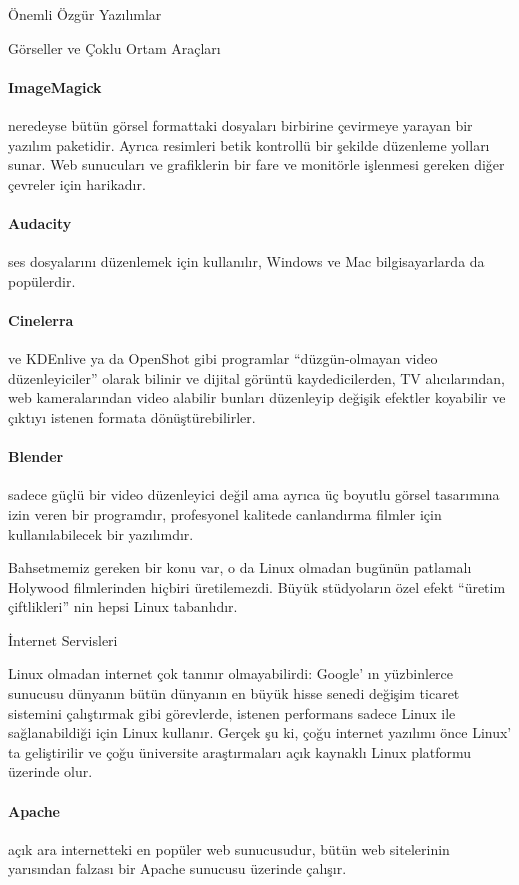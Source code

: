 \documentclass[10pt,a5paper]{book}
\begin{document}
\begin{section}{Önemli Özgür Yazılımlar}
\begin{subsection}{Görseller ve Çoklu Ortam Araçları}
\paragraph{ImageMagick}{neredeyse bütün görsel formattaki dosyaları birbirine çevirmeye yarayan bir yazılım paketidir. Ayrıca resimleri betik kontrollü bir şekilde düzenleme yolları sunar. Web sunucuları ve grafiklerin bir fare ve monitörle işlenmesi gereken diğer çevreler için harikadır.}
\paragraph{Audacity}{ses dosyalarını düzenlemek için kullanılır, Windows ve Mac bilgisayarlarda da popülerdir.}
\paragraph{Cinelerra}{ve KDEnlive ya da OpenShot gibi programlar “düzgün-olmayan video düzenleyiciler” olarak bilinir ve dijital görüntü kaydedicilerden, TV alıcılarından, web kameralarından video alabilir bunları düzenleyip değişik efektler koyabilir ve çıktıyı istenen formata dönüştürebilirler.}
\paragraph{Blender}{sadece güçlü bir video düzenleyici değil ama ayrıca üç boyutlu görsel tasarımına izin veren bir programdır, profesyonel kalitede canlandırma filmler için kullanılabilecek bir yazılımdır.}

Bahsetmemiz gereken bir konu var, o da Linux olmadan bugünün patlamalı Holywood filmlerinden hiçbiri üretilemezdi. Büyük stüdyoların özel efekt “üretim çiftlikleri” nin hepsi Linux tabanlıdır.
\end{subsection}
\begin{subsection}{İnternet Servisleri}

Linux olmadan internet çok tanınır olmayabilirdi: Google' ın yüzbinlerce sunucusu dünyanın bütün dünyanın en büyük hisse senedi değişim ticaret sistemini çalıştırmak gibi görevlerde, istenen performans sadece Linux ile sağlanabildiği için Linux kullanır. Gerçek şu ki, çoğu internet yazılımı önce Linux' ta geliştirilir ve çoğu üniversite araştırmaları açık kaynaklı Linux platformu üzerinde olur.

\paragraph{Apache}{açık ara internetteki en popüler web sunucusudur, bütün web sitelerinin yarısından falzası bir Apache sunucusu üzerinde çalışır.}

\end{subsection}
\end{section}
\end{document}
